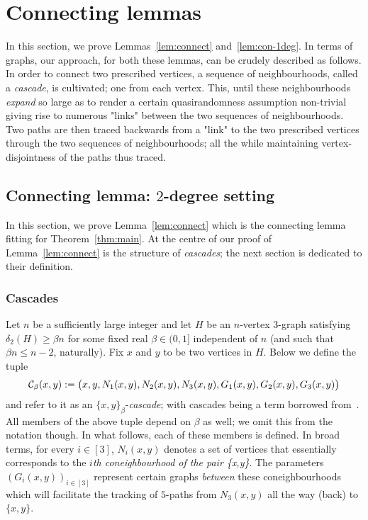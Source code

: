 \documentclass[11pt,reqno]{amsart}
\begin{document}
\section{Connecting lemmas}\label{sec:connect}

In this section, we prove Lemmas~\ref{lem:connect} and~\ref{lem:con-1deg}. 
In terms of graphs, our approach, for both these lemmas, can be crudely described as follows. In order to connect two prescribed vertices, a sequence of neighbourhoods, called a {\sl cascade}, is cultivated; one from each vertex. This, until these neighbourhoods {\sl expand} so large as to render a certain quasirandomness assumption non-trivial giving rise to numerous "links" between the two sequences of  neighbourhoods. Two paths are then traced backwards from a "link" to the two prescribed vertices through the two sequences of neighbourhoods; all the while maintaining vertex-disjointness of the paths thus traced.


\subsection{Connecting lemma: $2$-degree setting}

In this section, we prove Lemma~\ref{lem:connect} which is the connecting lemma fitting for Theorem~\ref{thm:main}. At the centre of our proof of Lemma~\ref{lem:connect} is the structure of {\sl cascades}; the next section is dedicated to their definition. 

\subsubsection{Cascades}\label{sec:cascades}

Let $n$ be a sufficiently large integer and let $H$ be an $n$-vertex $3$-graph satisfying $\delta_2(H) \geq \beta n$ for some fixed real $\beta \in (0,1]$ independent of $n$ (and such that $\beta n \leq n-2$, naturally).
Fix $x$ and $y$ to be two vertices in $H$. Below we define the tuple 
$$
\mathcal{C}_\beta(x,y):=\big(x,y,N_1(x,y),N_2(x,y),N_3(x,y),G_1(x,y),G_2(x,y),G_3(x,y)\big)
$$
and refer to it as an $\{x,y\}_\beta$-{\em cascade}; with cascades being a term borrowed from~\cite{RRS06}. All members of the above tuple depend on $\beta$ as well; we omit this from the notation though. In what follows, each of these members is defined. In broad terms, for every $i \in [3]$, $N_i(x,y)$ denotes a set of vertices that essentially corresponds to the {\sl $i$th coneighbourhood of the pair \{x,y\}}. The parameters $(G_i(x,y))_{i\in[3]}$ represent certain graphs {\sl between} these coneighbourhoods which will facilitate the tracking of $5$-paths from $N_3(x,y)$ all the way (back) to $\{x,y\}$. 
\vspace{1em}
\end{document}
